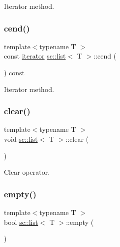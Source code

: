 Iterator method. 

\mbox{\label{classsc_1_1list_ad88fa640e2b8c767663ccc185bf23219}} 
\subsubsection{\texorpdfstring{cend()}{cend()}}
{\footnotesize\ttfamily template$<$typename T $>$ \\
const \hyperlink{classsc_1_1list_1_1iterator}{iterator} \hyperlink{classsc_1_1list}{sc\+::list}$<$ T $>$\+::cend (\begin{DoxyParamCaption}{ }\end{DoxyParamCaption}) const\hspace{0.3cm}{\ttfamily [inline]}}



Iterator method. 

\mbox{\label{classsc_1_1list_aece86319a40d15b88fd1a981ba1a226e}} 
\subsubsection{\texorpdfstring{clear()}{clear()}}
{\footnotesize\ttfamily template$<$typename T $>$ \\
void \hyperlink{classsc_1_1list}{sc\+::list}$<$ T $>$\+::clear (\begin{DoxyParamCaption}{ }\end{DoxyParamCaption})\hspace{0.3cm}{\ttfamily [inline]}}



Clear operator. 

\mbox{\label{classsc_1_1list_a8599ccd8f27e0f39a1c3051cd9d05bdb}} 
\subsubsection{\texorpdfstring{empty()}{empty()}}
{\footnotesize\ttfamily template$<$typename T $>$ \\
bool \hyperlink{classsc_1_1list}{sc\+::list}$<$ T $>$\+::empty (\begin{DoxyParamCaption}{ }\end{DoxyParamCaption})\hspace{0.3cm}{\ttfamily [inline]}}




